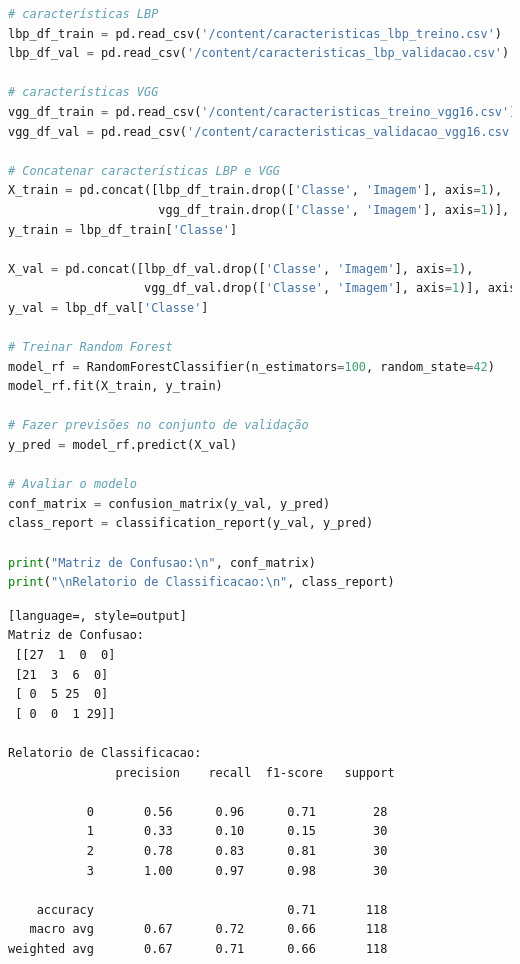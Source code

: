 \begin{lstlisting}[language=Python, style=input]
# características LBP
lbp_df_train = pd.read_csv('/content/caracteristicas_lbp_treino.csv')
lbp_df_val = pd.read_csv('/content/caracteristicas_lbp_validacao.csv')

# características VGG
vgg_df_train = pd.read_csv('/content/caracteristicas_treino_vgg16.csv')
vgg_df_val = pd.read_csv('/content/caracteristicas_validacao_vgg16.csv')

# Concatenar características LBP e VGG
X_train = pd.concat([lbp_df_train.drop(['Classe', 'Imagem'], axis=1),
                     vgg_df_train.drop(['Classe', 'Imagem'], axis=1)], axis=1)
y_train = lbp_df_train['Classe']

X_val = pd.concat([lbp_df_val.drop(['Classe', 'Imagem'], axis=1),
                   vgg_df_val.drop(['Classe', 'Imagem'], axis=1)], axis=1)
y_val = lbp_df_val['Classe']

# Treinar Random Forest
model_rf = RandomForestClassifier(n_estimators=100, random_state=42)
model_rf.fit(X_train, y_train)

# Fazer previsões no conjunto de validação
y_pred = model_rf.predict(X_val)

# Avaliar o modelo
conf_matrix = confusion_matrix(y_val, y_pred)
class_report = classification_report(y_val, y_pred)

print("Matriz de Confusao:\n", conf_matrix)
print("\nRelatorio de Classificacao:\n", class_report)
\end{lstlisting}

\begin{lstlisting}[language=, style=output]
Matriz de Confusao:
 [[27  1  0  0]
 [21  3  6  0]
 [ 0  5 25  0]
 [ 0  0  1 29]]

Relatorio de Classificacao:
               precision    recall  f1-score   support

           0       0.56      0.96      0.71        28
           1       0.33      0.10      0.15        30
           2       0.78      0.83      0.81        30
           3       1.00      0.97      0.98        30

    accuracy                           0.71       118
   macro avg       0.67      0.72      0.66       118
weighted avg       0.67      0.71      0.66       118
\end{lstlisting}

